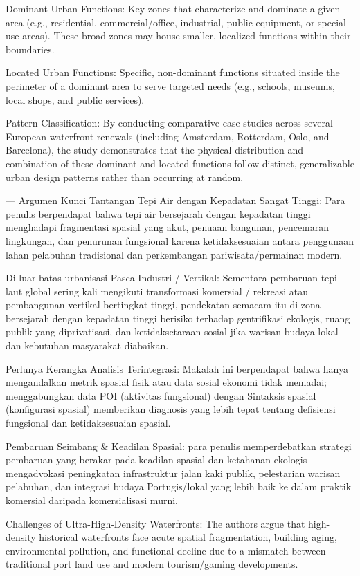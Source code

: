 \documentclass[../riset_senja.tex]{subfiles}
\begin{document}
Dominant Urban Functions: Key zones that characterize and dominate a given area (e.g., residential, commercial/office, industrial, public equipment, or special use areas). These broad zones may house smaller, localized functions within their boundaries.

Located Urban Functions: Specific, non-dominant functions situated inside the perimeter of a dominant area to serve targeted needs (e.g., schools, museums, local shops, and public services).

Pattern Classification: By conducting comparative case studies across several European waterfront renewals (including Amsterdam, Rotterdam, Oslo, and Barcelona), the study demonstrates that the physical distribution and combination of these dominant and located functions follow distinct, generalizable urban design patterns rather than occurring at random.

---
Argumen Kunci
Tantangan Tepi Air dengan Kepadatan Sangat Tinggi: Para penulis berpendapat bahwa tepi air bersejarah dengan kepadatan tinggi menghadapi fragmentasi spasial yang akut, penuaan bangunan, pencemaran lingkungan, dan penurunan fungsional karena ketidaksesuaian antara penggunaan lahan pelabuhan tradisional dan perkembangan pariwisata/permainan modern.

Di luar batas urbanisasi Pasca-Industri / Vertikal: Sementara pembaruan tepi laut global sering kali mengikuti transformasi komersial / rekreasi atau pembangunan vertikal bertingkat tinggi, pendekatan semacam itu di zona bersejarah dengan kepadatan tinggi berisiko terhadap gentrifikasi ekologis, ruang publik yang diprivatisasi, dan ketidaksetaraan sosial jika warisan budaya lokal dan kebutuhan masyarakat diabaikan.

Perlunya Kerangka Analisis Terintegrasi: Makalah ini berpendapat bahwa hanya mengandalkan metrik spasial fisik atau data sosial ekonomi tidak memadai; menggabungkan data POI (aktivitas fungsional) dengan Sintaksis spasial (konfigurasi spasial) memberikan diagnosis yang lebih tepat tentang defisiensi fungsional dan ketidaksesuaian spasial.

Pembaruan Seimbang \& Keadilan Spasial: para penulis memperdebatkan strategi pembaruan yang berakar pada keadilan spasial dan ketahanan ekologis-mengadvokasi peningkatan infrastruktur jalan kaki publik, pelestarian warisan pelabuhan, dan integrasi budaya Portugis/lokal yang lebih baik ke dalam praktik komersial daripada komersialisasi murni.

Challenges of Ultra-High-Density Waterfronts: The authors argue that high-density historical waterfronts face acute spatial fragmentation, building aging, environmental pollution, and functional decline due to a mismatch between traditional port land use and modern tourism/gaming developments.
\end{document}
